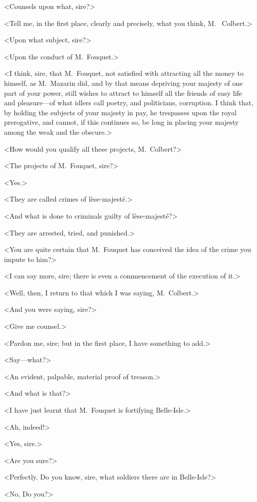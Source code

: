 <Counsels upon what, sire?>

<Tell me, in the first place, clearly and precisely, what you think, M.~ Colbert.>

<Upon what subject, sire?>

<Upon the conduct of M.~Fouquet.>

<I think, sire, that M.~Fouquet, not satisfied with attracting all the money to himself, as M.~Mazarin did, and by that means depriving your majesty of one part of your power, still wishes to attract to himself all the friends of easy life and pleasure—of what idlers call poetry, and politicians, corruption. I think that, by holding the subjects of your majesty in pay, he trespasses upon the royal prerogative, and cannot, if this continues so, be long in placing your majesty among the weak and the obscure.>

<How would you qualify all these projects, M.~Colbert?>

<The projects of M.~Fouquet, sire?>

<Yes.>

<They are called crimes of lèse-majesté.>

<And what is done to criminals guilty of lèse-majesté?>

<They are arrested, tried, and punished.>

<You are quite certain that M.~Fouquet has conceived the idea of the crime you impute to him?>

<I can say more, sire; there is even a commencement of the execution of it.>

<Well, then, I return to that which I was saying, M.~Colbert.>

<And you were saying, sire?>

<Give me counsel.>

<Pardon me, sire; but in the first place, I have something to add.>

<Say—what?>

<An evident, palpable, material proof of treason.>

<And what is that?>

<I have just learnt that M.~Fouquet is fortifying Belle-Isle.>

<Ah, indeed!>

<Yes, sire.>

<Are you sure?>

<Perfectly. Do you know, sire, what soldiers there are in Belle-Isle?>

<No,  Do you?>

